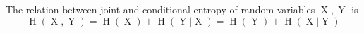 The relation between joint and conditional entropy of random variables $\operatorname{X},\operatorname{Y}$ is
$$\operatorname{H}(\operatorname{X}, \operatorname{Y}) = \operatorname{H}(\operatorname{X}) + \operatorname{H}(\operatorname{Y} | \operatorname{X}) = \operatorname{H}(\operatorname{Y}) + \operatorname{H}(\operatorname{X} |\operatorname{Y})$$
